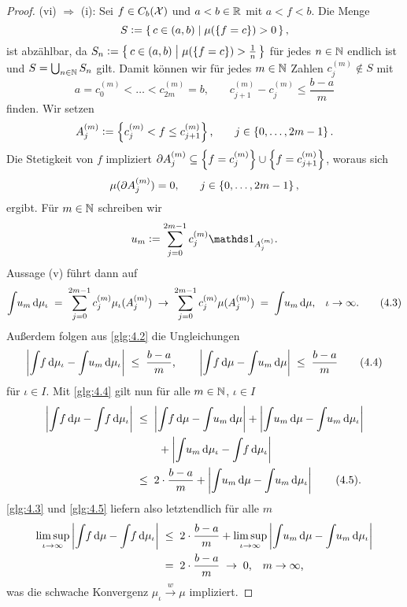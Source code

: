 \documentclass[../thesis/thesis.tex]{subfiles}
\begin{document}
\begin{proof}
		(vi) $\Rightarrow$ (i): Sei $f \in C_b(\mathcal{X})$ und $a < b \in \mathbb{R}$ 
		mit $a < f < b$. Die Menge
		$$S \vcentcolon = \left\{\, c \in (a, b) \; \middle| \; \mu(\left\{f = c\right\}) > 0 \,\right\} \text{,}$$
		ist abzählbar, da 
		$S_n \vcentcolon = \left\{\, c \in (a, b) \; \middle| \; \mu(\left\{f = c\right\}) > \frac{1}{n} \,\right\}$ 
		für jedes $n \in \mathbb{N}$ endlich ist und $S = \bigcup_{n \in \mathbb{N}} S_n$ gilt.
		Damit können wir für jedes $m \in \mathbb{N}$ Zahlen $c_j^{(m)} \notin S$ mit
		\[a = c_0^{(m)} < \dots < c_{2m}^{(m)} = 
		b \text{,} \qquad c_{j+1}^{(m)} - c_j^{(m)} \leq \frac{b-a}{m} 
		\label{glg:4.2} \tag{4.2}\]
		finden. Wir setzen
		$$A_j^{(m)} \vcentcolon = \left\{c_j^{(m)} < f \leq c_{j+1}^{(m)}\right\}\text{,}
		\qquad j \in \left\{0,\dots,2m-1\right\} \text{.}$$ 
		Die Stetigkeit von $f$ impliziert 
		$\partial A_j^{(m)} \subseteq \left\{f = c_j^{(m)}\right\} \cup \left\{f = c_{j+1}^{(m)}\right\}$, 
		woraus sich 
		$$\mu(\partial A_j^{(m)}) = 0 \text{,} \qquad j \in \left\{0,\dots,2m-1\right\} \text{,}$$
		ergibt. Für $m \in \mathbb{N}$ schreiben wir
		$$u_m \defby \sum_{j=0}^{2m-1} c_j^{(m)} \indfct_{A_j^{(m)}} \text{.}$$
		Aussage (v) führt dann auf
		\[\int_{} \, u_m \, \mathrm{d}\mu_\iota \; = \; \sum_{j=0}^{2m-1} c_j^{(m)} \mu_\iota(A_j^{(m)}) 
		\; \to \; \sum_{j=0}^{2m-1} c_j^{(m)} \mu(A_j^{(m)}) \; = \; 
		\int_{} \, u_m \, \mathrm{d}\mu \text{,} \quad \iota \to \infty \text{.} 
		\label{glg:4.3} \tag{4.3}\]
		Außerdem folgen aus \eqref{glg:4.2} die Ungleichungen
		\[\left| \int_{} \, f \, \mathrm{d}\mu_\iota - \int_{} \, u_m \, \mathrm{d}\mu_\iota \right| \; \leq \; 
		\frac{b-a}{m} \text{,} \qquad 
		\left| \int_{} \, f \, \mathrm{d}\mu - \int_{} \, u_m \, \mathrm{d}\mu \right| \; \leq \; 
		\frac{b-a}{m} \label{glg:4.4} \tag{4.4}\]
		für $\iota \in I$.
		Mit \eqref{glg:4.4} gilt nun für alle $m \in \mathbb{N}$, $\iota \in I$
		\begin{align*}
			\left| \int_{} \, f \, \mathrm{d}\mu - \int_{} \, f \, \mathrm{d}\mu_\iota \right| \; &\leq \; 
			\left| \int_{} \, f \, \mathrm{d}\mu - \int_{} \, u_m \, \mathrm{d}\mu \right| + 
			\left| \int_{} \, u_m \, \mathrm{d}\mu - \int_{} \, u_m \, \mathrm{d}\mu_\iota \right| \\ & \qquad + 
			\left| \int_{} \, u_m \, \mathrm{d}\mu_\iota - \int_{} \, f \, \mathrm{d}\mu_\iota \right| \\
			&\leq \; 2 \cdot \frac{b-a}{m} + \left| \int_{} \, u_m \, \mathrm{d}\mu - 
			\int_{} \, u_m \, \mathrm{d}\mu_\iota \right| \label{glg:4.5} \tag{4.5}\text{.}
		\end{align*}
		\eqref{glg:4.3} und \eqref{glg:4.5} liefern also letztendlich für alle $m$
		\begin{align*}
			\limsup_{\iota \to \infty} \left| \int_{} \, f \, \mathrm{d}\mu - 
			\int_{} \, f \, \mathrm{d}\mu_\iota \right|
			\; &\leq \; 2 \cdot \frac{b-a}{m} + 
			\limsup_{\iota \to \infty} \left| \int_{} \, u_m \, \mathrm{d}\mu - 
			\int_{} \, u_m \, \mathrm{d}\mu_\iota \right| \\
			&= \; 2 \cdot \frac{b-a}{m} \; \to \; 0 \text{,} 
			\quad m \to \infty \text{,}
		\end{align*}
		was die schwache Konvergenz $\mu_\iota \xrightarrow{w} \mu$ impliziert.
	\end{proof}
\end{document}
